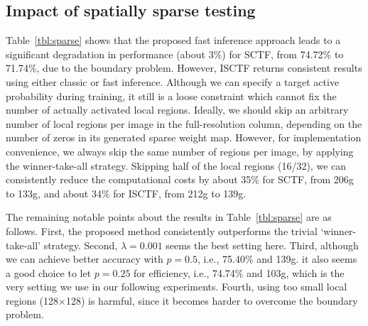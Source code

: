 \documentclass[10pt,twocolumn,letterpaper]{article}
\begin{document}
\subsection{Impact of spatially sparse testing}\label{subsec:sparse}
%
Table~\ref{tbl:sparse} shows that the proposed fast inference approach leads to a significant degradation in performance (about 3\%) for SCTF,
from 74.72\% to 71.74\%, due to the boundary problem.
However, ISCTF returns consistent results using either classic or fast inference.
Although we can specify a target active probability during training,
it still is a loose constraint which cannot fix the number of actually activated local regions.
Ideally, we should skip an arbitrary number of local regions per image in the full-resolution column,
depending on the number of zeros in its generated sparse weight map.
However, for implementation convenience,
we always skip the same number of regions per image,
by applying the winner-take-all strategy.
Skipping half of the local regions (16/32), we can consistently reduce the computational costs by about 35\% for SCTF, from 206g to 133g,
and about 34\% for ISCTF, from 212g to 139g.

The remaining notable points about the results in Table~\ref{tbl:sparse} are as follows.
First, the proposed method consistently outperforms the trivial `winner-take-all' strategy.
Second, $\lambda = 0.001$ seems the best setting here.
Third, although we can achieve better accuracy with $p = 0.5$, i.e., 75.40\% and 139g.
it also seems a good choice to let $p = 0.25$ for efficiency, i.e., 74.74\% and 103g,
which is the very setting we use in our following experiments.
Fourth, using too small local regions (128$\times$128) is harmful,
since it becomes harder to overcome the boundary problem.
%
%
%
\end{document}
